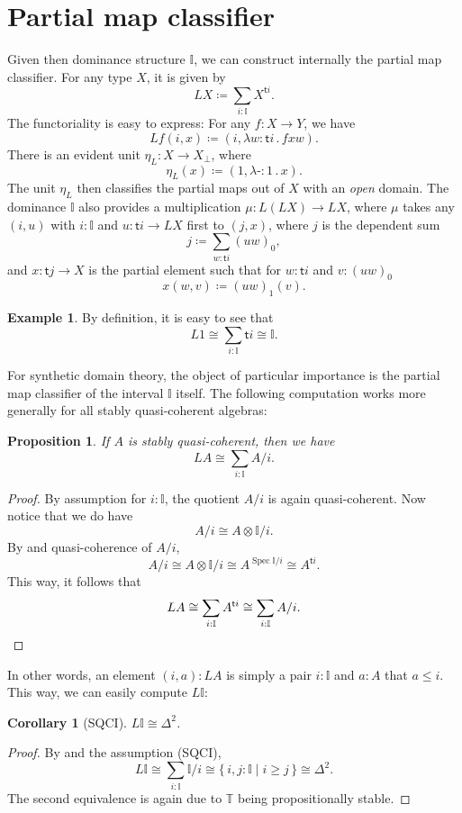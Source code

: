 \documentclass[a4paper,12pt]{amsart}
\newtheorem{corollary}[theorem]{Corollary}
\newtheorem{proposition}[theorem]{Proposition}
\theoremstyle{definition}
\newtheorem{example}[theorem]{Example}
\newcommand{\mbb}[1]{\mathbb{#1}}
\newcommand{\T}{\mbb T}
\newcommand{\I}{\mbb I}
\newcommand{\ms}[1]{\mathsf{#1}}
\newcommand{\scomp}[2]{\{\,#1\mid#2\,\}}
\newcommand{\prt}{_{\bot}}
\newcommand{\ld}[2]{\lambda #1\!\colon\!\!#2\mathpunct{.}}
\newcommand{\hp}{\text{-}}
\newcommand{\spec}{\operatorname{Spec}}
\begin{document}
\section{Partial map classifier}\label{sec:lifting}
Given then dominance structure $\I$, we can construct internally the partial map classifier. For any type $X$, it is given by
\[ L X \coloneq \sum_{i:\I}X^{\ms ti}. \]
The functoriality is easy to express: For any $f \colon X \to Y$, we have
\[ L f(i,x) \coloneq (i,\ld{w}{\ms ti}fxw). \]
There is an evident unit $\eta_L \colon X \to X\prt$, where
\[ \eta_L(x) \coloneq (1,\ld\hp 1 x). \]
The unit $\eta_L$ then classifies the partial maps out of $X$ with an \emph{open} domain. The dominance $\I$ also provides a multiplication $\mu \colon L(L X) \to L X$, where $\mu$ takes any $(i,u)$ with $i : \I$ and $u \colon \ms ti \to L X$ first to $(j,x)$, where $j$ is the dependent sum
\[ j \coloneq \sum_{w:\ms ti} (uw)_0, \]
and $x \colon \ms tj \to X$ is the partial element such that for $w : \ms ti$ and $v : (uw)_0$
\[ x(w,v) \coloneq (uw)_1(v). \]

\begin{example}
  By definition, it is easy to see that
  \[ L 1 \cong \sum_{i:\I}\ms ti \cong \I. \]
\end{example}

For synthetic domain theory, the object of particular importance is the partial map classifier of the interval $\I$ itself. The following computation works more generally for all stably quasi-coherent algebras:

\begin{proposition}\label{prop:liftingofalgebra}
  If $A$ is stably quasi-coherent, then we have
  \[ L A \cong \sum_{i:\I}A/i. \]
\end{proposition}
\begin{proof}
  By assumption for $i : \I$, the quotient $A/i$ is again quasi-coherent. Now notice that we do have
  \[ A/i \cong A \otimes \I/i. \]
  By  and quasi-coherence of $A/i$, 
  \[ A/i \cong A \otimes \I/i \cong A^{\spec \I/i} \cong A^{\ms ti}. \]
  This way, it follows that 
  \[ L A \cong \sum_{i:\I}A^{\ms ti} \cong \sum_{i:\I}A/i. \qedhere \]
\end{proof}

In other words, an element $(i,a) : L A$ is simply a pair $i : \I$ and $a : A$ that $a \le i$. This way, we can easily compute $L \I$:

\begin{corollary}[SQCI]
  $L \I \cong \Delta^2$.
\end{corollary}
\begin{proof}
  By  and the assumption (SQCI),
  \[ L\I \cong \sum_{i:\I}\I/i \cong \scomp{i,j : \I}{i \ge j} \cong \Delta^2. \]
  The second equivalence is again due to $\T$ being propositionally stable.
\end{proof}
\end{document}
